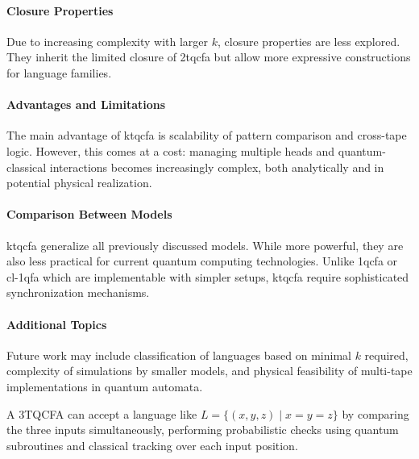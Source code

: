 \paragraph{Closure Properties}  
Due to increasing complexity with larger $k$, closure properties are less explored. They inherit the limited closure of \gls{2tqcfa} but allow more expressive constructions for language families.

\paragraph{Advantages and Limitations}  
The main advantage of \gls{ktqcfa} is scalability of pattern comparison and cross-tape logic. However, this comes at a cost: managing multiple heads and quantum-classical interactions becomes increasingly complex, both analytically and in potential physical realization.

\paragraph{Comparison Between Models}  
\gls{ktqcfa} generalize all previously discussed models. While more powerful, they are also less practical for current quantum computing technologies. Unlike \gls{1qcfa} or \gls{cl-1qfa} which are implementable with simpler setups, \gls{ktqcfa} require sophisticated synchronization mechanisms.

\paragraph{Additional Topics}  
Future work may include classification of languages based on minimal $k$ required, complexity of simulations by smaller models, and physical feasibility of multi-tape implementations in quantum automata.

\begin{example} 
A 3TQCFA can accept a language like $L = \{ (x, y, z) \mid x = y = z \}$ by comparing the three inputs simultaneously, performing probabilistic checks using quantum subroutines and classical tracking over each input position.
\end{example}